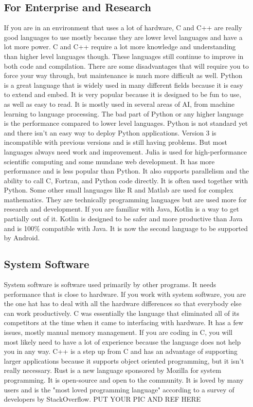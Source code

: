 \documentclass[letterpaper, 10 pt, conference]{IEEEtran}
\begin{document}
\subsection{For Enterprise and Research}
\indent If you are in an environment that uses a lot of hardware, C and C++ are really good languages to use mostly because they are lower level languages and have a lot more power. C and C++ require a lot more knowledge and understanding than higher level languages though. These languages still continue to improve in both code and compilation. There are some disadvantages that will require you to force your way through, but maintenance is much more difficult as well. Python is a great language that is widely used in many different fields because it is easy to extend and embed. It is very popular because it is designed to be fun to use, as well as easy to read. It is mostly used in several areas of AI, from machine learning to language processing. The bad part of Python or any higher language is the performance compared to lower level languages. Python is not standard yet and there isn't an easy way to deploy Python applications. Version 3 is incompatible with previous versions and is still having problems. But most languages always need work and improvement.  Julia is used for high-performance scientific computing and some mundane web development. It has more performance and is less popular than Python. It also supports parallelism and the ability to call C, Fortran, and Python code directly. It is often used together with Python. Some other small languages like R and Matlab are used for complex mathematics. They are technically programming languages but are used more for research and development. If you are familiar with Java, Kotlin is a way to get partially out of it. Kotlin is designed to be safer and more productive than Java and is 100\% compatible with Java. It is now the second language to be supported by Android. 
\newline
\subsection{System Software}
\indent System software is software used primarily by other programs. It needs performance that is close to hardware. If you work with system software, you are the one hat has to deal with all the hardware differences so that everybody else can work productively. C was essentially the language that eliminated all of its competitors at the time when it came to interfacing with hardware. It has a few issues, mostly manual memory management. If you are coding in C, you will most likely need to have a lot of experience because the language does not help you in any way. C++ is a step up from C and has an advantage of supporting larger applications because it supports object oriented programming, but it isn't really necessary. Rust is a new language sponsored by Mozilla for system programming. It is open-source and open to the community. It is loved by many users and is the "most loved programming language" according to a survey of developers by StackOverflow. PUT YOUR PIC AND REF HERE
\newline
\end{document}
